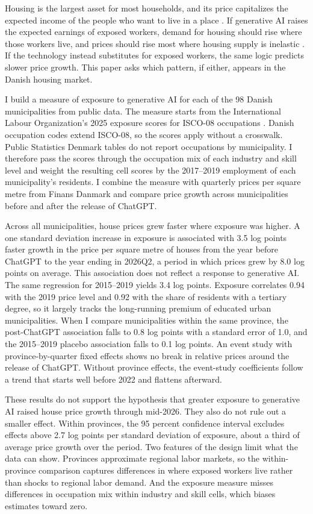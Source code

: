 \documentclass[12pt]{article}
\begin{document}
Housing is the largest asset for most households, and its price capitalizes the expected income of the people who want to live in a place \citep{roback1982, moretti2011, notowidigdo2020}. If generative AI raises the expected earnings of exposed workers, demand for housing should rise where those workers live, and prices should rise most where housing supply is inelastic \citep{glaeser2008, saiz2010}. If the technology instead substitutes for exposed workers, the same logic predicts slower price growth. This paper asks which pattern, if either, appears in the Danish housing market.

I build a measure of exposure to generative AI for each of the 98 Danish municipalities from public data. The measure starts from the International Labour Organization's 2025 exposure scores for ISCO-08 occupations \citep{gmyrek2025}. Danish occupation codes extend ISCO-08, so the scores apply without a crosswalk. Public Statistics Denmark tables do not report occupations by municipality. I therefore pass the scores through the occupation mix of each industry and skill level and weight the resulting cell scores by the 2017--2019 employment of each municipality's residents. I combine the measure with quarterly prices per square metre from Finans Danmark and compare price growth across municipalities before and after the release of ChatGPT.

Across all municipalities, house prices grew faster where exposure was higher. A one standard deviation increase in exposure is associated with 3.5 log points faster growth in the price per square metre of houses from the year before ChatGPT to the year ending in 2026Q2, a period in which prices grew by 8.0 log points on average. This association does not reflect a response to generative AI. The same regression for 2015--2019 yields 3.4 log points. Exposure correlates 0.94 with the 2019 price level and 0.92 with the share of residents with a tertiary degree, so it largely tracks the long-running premium of educated urban municipalities. When I compare municipalities within the same province, the post-ChatGPT association falls to 0.8 log points with a standard error of 1.0, and the 2015--2019 placebo association falls to 0.1 log points. An event study with province-by-quarter fixed effects shows no break in relative prices around the release of ChatGPT. Without province effects, the event-study coefficients follow a trend that starts well before 2022 and flattens afterward.

These results do not support the hypothesis that greater exposure to generative AI raised house price growth through mid-2026. They also do not rule out a smaller effect. Within provinces, the 95 percent confidence interval excludes effects above 2.7 log points per standard deviation of exposure, about a third of average price growth over the period. Two features of the design limit what the data can show. Provinces approximate regional labor markets, so the within-province comparison captures differences in where exposed workers live rather than shocks to regional labor demand. And the exposure measure misses differences in occupation mix within industry and skill cells, which biases estimates toward zero.
\end{document}
